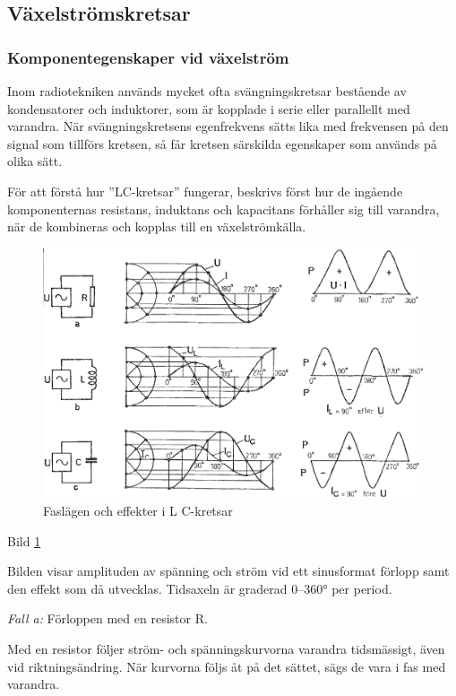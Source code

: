 \subsection{Växelströmskretsar}

\subsubsection{Komponentegenskaper vid växelström}

Inom radiotekniken används mycket ofta svängningskretsar bestående av
kondensatorer och induktorer, som är kopplade i serie eller parallellt med
varandra. När svängningskretsens egenfrekvens sätts lika med frekvensen på den
signal som tillförs kretsen, så får kretsen särskilda egenskaper som används på
olika sätt.

För att förstå hur ''LC-kretsar'' fungerar, beskrivs först hur de ingående
komponenternas resistans, induktans och kapacitans förhåller sig till varandra,
när de kombineras och kopplas till en växelströmkälla.

\begin{figure}
\includegraphics[width=\textwidth]{images/bild_2_3-11.png}
\caption{Faslägen och effekter i L C-kretsar}
\label{fig:BildII3-11}
\end{figure}

Bild \ref{fig:BildII3-11}

Bilden visar amplituden av spänning och ström vid ett sinusformat förlopp samt
den effekt som då utvecklas. Tidsaxeln är graderad 0--360° per period.

\emph{Fall a:} Förloppen med en resistor R.

Med en resistor följer ström- och spänningskurvorna varandra tidsmässigt, även
vid riktningsändring. När kurvorna följs åt på det sättet, sägs de vara i fas
med varandra.

